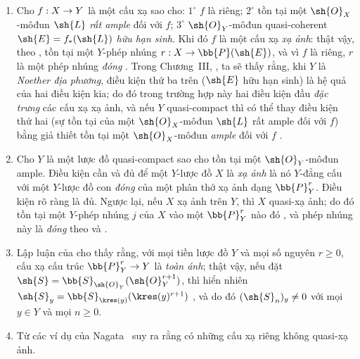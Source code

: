 \documentclass[oneside,10pt]{amsart}
\makeatletter
\renewcommand{\geq}{\geqslant}
\newcommand{\ega@arrow}[2]{\mathchoice{#1}{#2}{#2}{#2}}
\renewcommand{\to}{\ega@arrow{\longrightarrow}{\rightarrow}}
\newcommand{\oldpage}[2][]{\marginnote{\normalfont\footnotesize\textbf{#1}~|~#2}\ignorespaces}
\let\EGAOriginalLabel\label
\renewcommand{\label}[1]{\phantomsection\EGAOriginalLabel{#1}}
\makeatother
\begin{document}
\begin{remark}[5.5.4]
\label{II.5.5.4}
\medskip\noindent
\begin{enumerate}
  \item[(i)] Cho $f:X\to Y$ là một cấu xạ sao cho: $1^\circ$ $f$ là riêng; $2^\circ$ tồn tại một $\sh{O}_X$-môđun $\sh{L}$ \emph{rất ample} đối với $f$; $3^\circ$ $\sh{O}_Y$-môđun quasi-coherent $\sh{E}=f_*(\sh{L})$ \emph{hữu hạn sinh}.
    Khi đó $f$ là một cấu xạ \emph{xạ ảnh}: thật vậy, theo , tồn tại một $Y$-phép nhúng $r:X\to\bb{P}(\sh{E})$, và vì $f$ là riêng, $r$ là một phép nhúng \emph{đóng} .
    Trong Chương~III, , ta sẽ thấy rằng, khi $Y$ là \emph{Noether địa phương}, điều kiện thứ ba trên ($\sh{E}$ hữu hạn sinh) là hệ quả của hai điều kiện kia; do đó trong trường hợp này hai điều kiện đầu \emph{đặc trưng} các cấu xạ xạ ảnh, và nếu $Y$ quasi-compact thì có thể thay điều kiện thứ hai (sự tồn tại của một $\sh{O}_X$-môđun $\sh{L}$ rất ample đối với $f$) bằng giả thiết tồn tại một $\sh{O}_X$-môđun \emph{ample} đối với $f$ .
  \item[(ii)] Cho $Y$ là một lược đồ quasi-compact sao cho tồn tại một $\sh{O}_Y$-môđun ample.
    Điều kiện cần và đủ để một $Y$-lược đồ $X$ là \emph{xạ ảnh} là nó $Y$-đẳng cấu với một $Y$-lược đồ con \emph{đóng} của một phân thớ xạ ảnh dạng $\bb{P}_Y^r$.
    Điều kiện rõ ràng là đủ.
\oldpage[II]{105}
Ngược lại, nếu $X$ xạ ảnh trên $Y$, thì $X$ quasi-xạ ảnh; do đó tồn tại một $Y$-phép nhúng $j$ của $X$ vào một $\bb{P}_Y^r$ nào đó , và phép nhúng này là \emph{đóng} theo  và .
  \item[{\rm(iii)}] Lập luận của  cho thấy rằng, với mọi tiền lược đồ $Y$ và mọi số nguyên $r\geq0$, cấu xạ cấu trúc $\bb{P}_Y^r\to Y$ là \emph{toàn ánh}; thật vậy, nếu đặt $\sh{S}=\bb{S}_{\sh{O}_Y}(\sh{O}_Y^{r+1})$, thì hiển nhiên $\sh{S}_y=\bb{S}_{\kres(y)}(\kres(y)^{r+1})$ , và do đó $(\sh{S}_n)_y\neq0$ với mọi $y\in Y$ và mọi $n\geq0$.
  \item[{\rm(iv)}] Từ các ví dụ của Nagata~\cite{II-26} suy ra rằng có những cấu xạ riêng không quasi-xạ ảnh.
\end{enumerate}
\end{remark}
\end{document}
